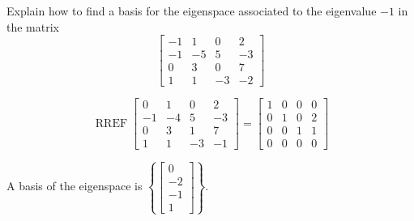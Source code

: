 
\begin{exerciseStatement}


Explain how to find a basis for the eigenspace associated to the eigenvalue \( -1 \) in the matrix \[ \left[\begin{array}{cccc}
-1 & 1 & 0 & 2 \\
-1 & -5 & 5 & -3 \\
0 & 3 & 0 & 7 \\
1 & 1 & -3 & -2
\end{array}\right] \]


\end{exerciseStatement}
    
\begin{exerciseAnswer} 


\[\operatorname{RREF} \left[\begin{array}{cccc}
0 & 1 & 0 & 2 \\
-1 & -4 & 5 & -3 \\
0 & 3 & 1 & 7 \\
1 & 1 & -3 & -1
\end{array}\right] = \left[\begin{array}{cccc}
1 & 0 & 0 & 0 \\
0 & 1 & 0 & 2 \\
0 & 0 & 1 & 1 \\
0 & 0 & 0 & 0
\end{array}\right] \]



A basis of the eigenspace is \( \left\{ \left[\begin{array}{c}
0 \\
-2 \\
-1 \\
1
\end{array}\right] \right\} \).


\end{exerciseAnswer}
    
